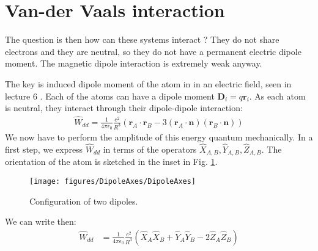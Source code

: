 \documentclass[10pt]{article}
\let\cite\citep
\providecommand\citep{\cite}
\begin{document}
\section{Van-der Vaals interaction}
The question is then how can these systems interact ? They do not share electrons and they are neutral, so they do not have a permanent electric dipole moment. The magnetic dipole interaction is extremely weak anyway. 

The key is induced dipole moment of the atom in in an electric field, seen in lecture 6 \cite{Jendrzejewski}. Each of the atoms can have a dipole moment $\mathbf{D}_i = q \mathbf{r}_i$.  As each atom is neutral, they interact through their dipole-dipole interaction:
\begin{align}\label{Eq:DipoleDipoleInteraction}
\hat{W}_{dd} =\frac{1}{4\pi \epsilon_0}\frac{e^2}{R^3}\left(\mathbf{r}_A\cdot \mathbf{r}_B-3(\mathbf{r}_A\cdot \mathbf{n})(\mathbf{r}_B\cdot \mathbf{n})\right)
\end{align}
We now have to perform the amplitude of this energy quantum mechanically.  In a first step, we express $\hat{W}_{dd}$ in terms of the operators $\hat{X}_{A,B}, \hat{Y}_{A,B}, \hat{Z}_{A,B}$.  The orientation of the atom is sketched in the inset in Fig. \ref{710038}.
\begin{figure}[h!]
\begin{center}
\texttt{[image: figures/DipoleAxes/DipoleAxes]}
\caption{{Configuration of two dipoles.
{\label{710038}}%
}}
\end{center}
\end{figure}

We can write then:
\begin{align}
\hat{W}_{dd} &=\frac{1}{4\pi \epsilon_0}\frac{e^2}{R^3}\left(\hat{X}_A \hat{X}_B + \hat{Y}_A\hat{Y}_B - 2 \hat{Z}_A \hat{Z}_B\right)
\end{align}
\end{document}
